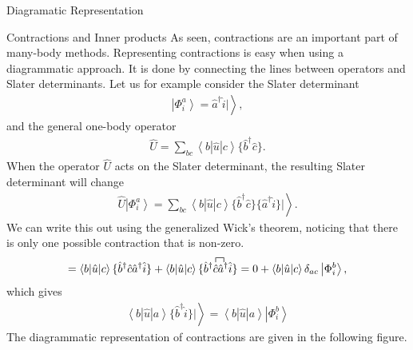 \documentclass[twoside,english]{uiofysmaster}
\begin{document}
\begin{chapter}{Diagramatic Representation}
	\begin{section}{Contractions and Inner products}
		As seen, contractions are an important part of many-body methods. Representing contractions is easy when using a diagrammatic approach. It is done by connecting the lines between operators and Slater determinants. 
Let us for example consider
the Slater determinant \cite{Audun,ShavittAndBartlett}
		\begin{align}
			\left| \Phi_i^a \right> = \hat a^\dagger \hat i | \left. \right>,
		\end{align}
		and the general one-body operator 
		\begin{align}
			\hat U = \sum_{bc} \left< b | \hat u | c \right> \{ \hat b^\dagger \hat c \}.
		\end{align}
		When the operator $\hat U$ acts on the Slater determinant, the resulting Slater determinant will change 
		\begin{align}
			\hat U \left| \Phi_i^a \right> = \sum_{bc} \left< b | \hat u | c \right> \{ \hat b^\dagger \hat c \} \{ \hat a^\dagger \hat i \} | \left. \right>.
		\end{align}
		We can write this out using the generalized Wick's theorem, noticing that there is only one possible contraction that is non-zero. 
		\begin{align}
			= \left< b | \hat u | c \right> \{ \hat b^\dagger \hat c \hat a^\dagger \hat i \} + \left< b | \hat u | c \right> \{ \hat b^\dagger \contraction{}{\hat c}{}{\hat a^\dagger}
			\hat c \hat a^\dagger \hat i \} = 0 + \left< b | \hat u | c \right> \delta_{ac} \left| \Phi_i^b \right>,
		\end{align}
		which gives
		\begin{align}
			\left< b | \hat u | a \right> \{ \hat b^\dagger \hat i \} | \left. \right> = \left< b | \hat u | a \right> \left| \Phi_i^b \right>
		\end{align}
		The diagrammatic representation of contractions are given in the following figure.
		\newpage 
		\begin{figure}[H]

\end{figure}
\end{section}
\end{chapter}
\end{document}
